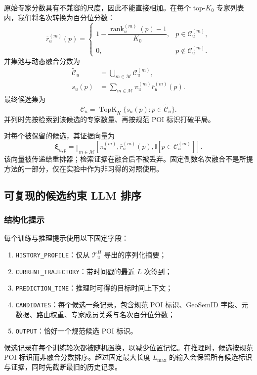 \documentclass[10pt,fontset=none,twocolumn]{ctexart}
\newcommand{\Experts}{\mathcal{M}}
\newcommand{\Ind}{\mathbb{I}}
\begin{document}
原始专家分数具有不兼容的尺度，因此不能直接相加。在每个 top-$K_0$ 专家列表内，我们将名次转换为百分位分数：
\begin{equation}
\overline r_{u}^{(m)}(p)
=
\begin{cases}
1-\dfrac{\operatorname{rank}_{u}^{(m)}(p)-1}{K_0},
&
p\in\mathcal{C}_{u}^{(m)},\\[7pt]
0,
&
p\notin\mathcal{C}_{u}^{(m)}.
\end{cases}
\label{eq:rank_percentile}
\end{equation}
并集池与动态融合分数为
\begin{align}
\widetilde{\mathcal{C}}_u
&=
\bigcup_{m\in\Experts}\mathcal{C}_{u}^{(m)},
\label{eq:union_pool}\\
s_u(p)
&=
\sum_{m\in\Experts}
\pi_u^{(m)}\overline r_u^{(m)}(p).
\label{eq:dynamic_fusion}
\end{align}
最终候选集为
\begin{equation}
\mathcal{C}_u
=
\operatorname{TopK}_{K}
\{s_u(p):p\in\widetilde{\mathcal{C}}_u\}.
\label{eq:final_candidate}
\end{equation}
并列时先按检索到该候选的专家数量、再按规范 POI 标识打破平局。

对每个被保留的候选，其证据向量为
\begin{equation}
\bm{\xi}_{u,p}
=
\mathop{\Vert}_{m\in\Experts}
[
\pi_u^{(m)},
\overline r_u^{(m)}(p),
\Ind[p\in\mathcal{C}_u^{(m)}]
].
\label{eq:evidence_vector}
\end{equation}
该向量被传递给重排器；检索证据在融合后不被丢弃。固定倒数名次融合不是所提方法的一部分，仅在实验中作为非习得的对照使用。

\subsection{可复现的候选约束 LLM 排序}
\label{subsec:ranker}

\subsubsection{结构化提示}

每个训练与推理提示使用以下固定字段：
\begin{enumerate}[leftmargin=*,nosep]
\item \texttt{HISTORY\_PROFILE}：仅从 $\mathcal{T}_{u}^{H}$ 导出的序列化摘要；
\item \texttt{CURRENT\_TRAJECTORY}：带时间戳的最近 $L$ 次签到；
\item \texttt{PREDICTION\_TIME}：推理时可得的目标时间上下文；
\item \texttt{CANDIDATES}：每个候选一条记录，包含规范 POI 标识、GeoSemID 字段、元数据、路由权重、专家成员关系与名次百分位分数；
\item \texttt{OUTPUT}：恰好一个规范候选 POI 标识。
\end{enumerate}
候选记录在每个训练轮次都被随机置换，以减少位置记忆。在推理时，候选按规范 POI 标识而非融合分数排序。超过固定最大长度 $L_{\max}$ 的输入会保留所有候选标识与证据，同时先截断最旧的历史记录。
\end{document}
